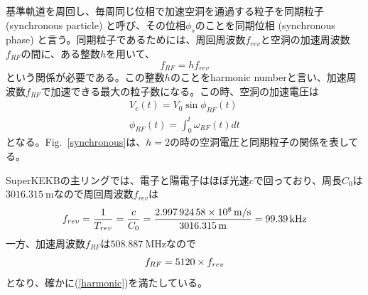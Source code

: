 \documentclass[10pt,a4paper]{jlreq}
\begin{document}
基準軌道を周回し、毎周同じ位相で加速空洞を通過する粒子を同期粒子 (synchronous particle) と呼び、その位相$\phi_s$のことを同期位相 (synchronous phase) と言う。同期粒子であるためには、周回周波数$f_{rev}$と空洞の加速周波数$f_{RF}$の間に、ある整数$h$を用いて、
%
\begin{equation}
  f_{RF} = h f_{rev}
  \label{harmonic}
\end{equation}
%
という関係が必要である。この整数$h$のことをharmonic numberと言い、加速周波数$f_{RF}$で加速できる最大の粒子数になる。この時、空洞の加速電圧は
%
\begin{equation}
  \begin{split}
    V_c (t) = V_0 \sin \phi_{RF}(t) \\
    \phi_{RF}(t) = \int_0^t \omega_{RF}(t) dt
  \end{split}
\end{equation}
%
となる。Fig.~\ref{synchronous}は、$h=2$の時の空洞電圧と同期粒子の関係を表してる。

\vspace{\baselineskip}

\begin{tcolorbox}[title=\textgt{SuperKEKBにおける$f_{RF}$, $f_{0}$, $h$}の関係]
  SuperKEKBの主リングでは、電子と陽電子はほぼ光速$c$で回っており、周長$C_0$は$\SI{3016.315}{\meter}$なので周回周波数$f_{rev}$は
  \begin{equation}
    f_{rev} = \frac{1}{T_{rev}}=\frac{c}{C_0}=\frac{\SI{2.99792458e8}{\meter / \second}}{\SI{3016.315}{\meter}}=\SI{99.39}{\kilo\hertz} \notag
  \end{equation}
  一方、加速周波数$f_{RF}$は$\SI{508.887}{\mega\hertz}$なので
  \begin{equation}
      f_{RF} = 5120 \times f_{rev} \notag
  \end{equation}
  となり、確かに(\ref{harmonic})を満たしている。
\end{tcolorbox}
\end{document}

